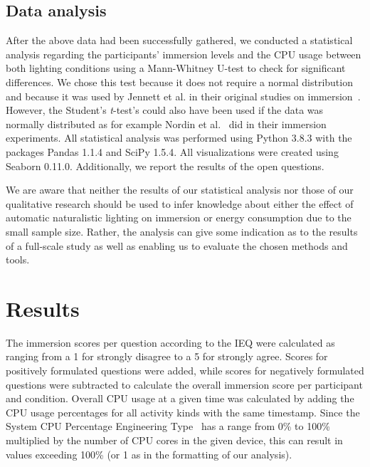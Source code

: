 \documentclass[12pt,twoside,english]{article}
\begin{document}
\subsection{Data analysis}
\label{sect:data_analysis}

After the above data had been successfully gathered, we conducted a statistical analysis regarding the participants' immersion levels and the \gls{CPU} usage between both lighting conditions using a Mann-Whitney U-test to check for significant differences.
We chose this test because it does not require a normal distribution and because it was used by Jennett et al. in their original studies on immersion~\cite{jennett_measuring_2008}.
However, the Student's \textit{t}-test's could also have been used if the data was normally distributed as for example Nordin et al.~\cite{nordin_attention_2013} did in their immersion experiments.
All statistical analysis was performed using Python 3.8.3 with the packages Pandas 1.1.4 and SciPy 1.5.4.
All visualizations were created using Seaborn 0.11.0.
Additionally, we report the results of the open questions.

We are aware that neither the results of our statistical analysis nor those of our qualitative research should be used to infer knowledge about either the effect of automatic naturalistic lighting on immersion or energy consumption due to the small sample size.
Rather, the analysis can give some indication as to the results of a full-scale study as well as enabling us to evaluate the chosen methods and tools.

\section{Results}
\label{sect:results}

The immersion scores per question according to the \gls{IEQ} were calculated as ranging from a 1 for strongly disagree to a 5 for strongly agree.
Scores for positively formulated questions were added, while scores for negatively formulated questions were subtracted to calculate the overall immersion score per participant and condition.
Overall \gls{CPU} usage at a given time was calculated by adding the \gls{CPU} usage percentages for all activity kinds with the same timestamp.
Since the System CPU Percentage Engineering Type~\cite{apple_system_2020} has a range from 0\% to 100\% multiplied by the number of \gls{CPU} cores in the given device, this can result in values exceeding 100\% (or 1 as in the formatting of our analysis).
\end{document}
